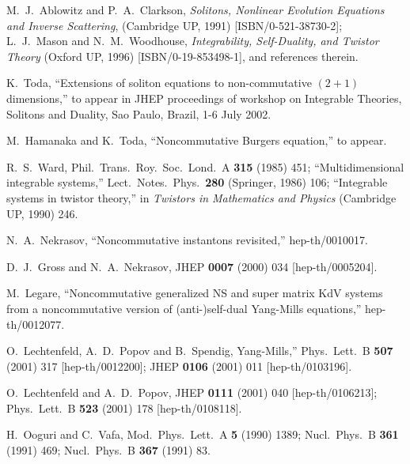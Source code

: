 \documentclass[a4paper,12pt]{article}\setlength{\topmargin}{-1cm}
\begin{document}
\begin{thebibliography}{99}
M.~J.~Ablowitz and P.~A.~Clarkson,
{\it Solitons, Nonlinear Evolution Equations and Inverse Scattering},
(Cambridge UP, 1991) [ISBN/0-521-38730-2];
L.~J.~Mason and N.~M.~Woodhouse,
{\it Integrability, Self-Duality, and Twistor Theory}
(Oxford UP, 1996)
[ISBN/0-19-853498-1], and references therein.

K.~Toda,
``Extensions of soliton equations to non-commutative $(2+1)$ dimensions,''
to appear in JHEP proceedings of workshop on 
Integrable Theories, Solitons and Duality, Sao Paulo, Brazil, 1-6 July 2002. 

M.~Hamanaka and K.~Toda,
``Noncommutative Burgers equation,''
to appear.

R.~S.~Ward,
Phil.\ Trans.\ Roy.\ Soc.\ Lond.\ A {\bf 315} (1985) 451;
``Multidimensional integrable systems,''
Lect.\ Notes.\ Phys.\ {\bf 280} (Springer, 1986) 106;
``Integrable systems in twistor theory,''
in {\it Twistors in Mathematics and Physics}
(Cambridge UP, 1990) 246.

N.~A.~Nekrasov,
``Noncommutative instantons revisited,''
hep-th/0010017.

D.~J.~Gross and N.~A.~Nekrasov,
JHEP {\bf 0007} (2000) 034
[hep-th/0005204].

M.~Legare,
``Noncommutative generalized NS and super matrix KdV systems from a  
noncommutative version of (anti-)self-dual Yang-Mills equations,''
hep-th/0012077.%

O.~Lechtenfeld, A.~D.~Popov and B.~Spendig,
Yang-Mills,''
Phys.\ Lett.\ B {\bf 507} (2001) 317
[hep-th/0012200];
JHEP {\bf 0106} (2001) 011
[hep-th/0103196].

O.~Lechtenfeld and A.~D.~Popov,
JHEP {\bf 0111} (2001) 040
[hep-th/0106213];
Phys.\ Lett.\ B {\bf 523} (2001) 178
[hep-th/0108118].

H.~Ooguri and C.~Vafa,
Mod.\ Phys.\ Lett.\ A {\bf 5} (1990) 1389;
Nucl.\ Phys.\ B {\bf 361} (1991) 469;
Nucl.\ Phys.\ B {\bf 367} (1991) 83.

\end{thebibliography}
\end{document}
